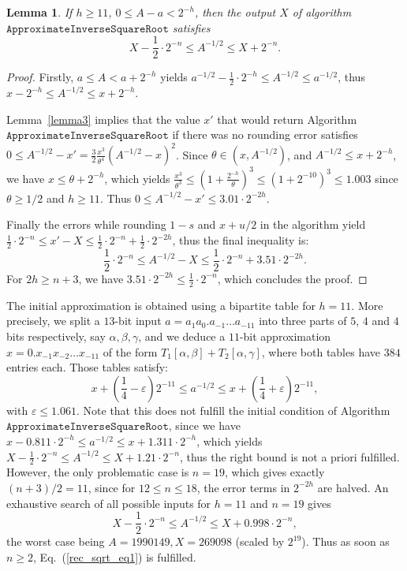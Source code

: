 \documentclass[12pt]{amsart}
\newtheorem{lemma}{Lemma}
\begin{document}
\begin{lemma} \label{lemma_recsqrt}
If $h \geq 11$, $0 \leq A - a < 2^{-h}$, then the output $X$ of algorithm
$\texttt{ApproximateInverseSquareRoot}$ satisfies
\begin{equation} \label{rec_sqrt_eq1}
X - \frac{1}{2} \cdot 2^{-n} \leq A^{-1/2} \leq X + 2^{-n}.
\end{equation}
\end{lemma}
\begin{proof}
Firstly, $a \leq A < a+2^{-h}$ yields
$a^{-1/2} - \frac{1}{2} \cdot 2^{-h} \leq A^{-1/2} \leq a^{-1/2}$,
thus $x - 2^{-h} \leq A^{-1/2} \leq x + 2^{-h}$.

Lemma~\ref{lemma3} implies that the value $x'$ that would return
Algorithm $\texttt{ApproximateInverseSquareRoot}$ if there was no rounding
error satisfies $0 \leq A^{-1/2} - x' = \frac{3}{2} \frac{x^3}{\theta^4} 
(A^{-1/2}-x)^2$. Since $\theta \in (x, A^{-1/2})$, and
$A^{-1/2} \leq x + 2^{-h}$, we have $x \leq \theta + 2^{-h}$,
which yields $\frac{x^3}{\theta^3} \leq (1 + \frac{2^{-h}}{\theta})^3
\leq (1 + 2^{-10})^3 \leq 1.003$ since $\theta \geq 1/2$ and $h \geq 11$.
Thus $0 \leq A^{-1/2} - x' \leq 3.01 \cdot 2^{-2h}$.

Finally the errors while rounding $1-s$ and $x+u/2$ in the algorithm 
yield $\frac{1}{2} \cdot 2^{-n} \leq x' - X \leq \frac{1}{2} \cdot 2^{-n}
+ \frac{1}{2} \cdot 2^{-2h}$, thus the final inequality is:
\[ \frac{1}{2} \cdot 2^{-n} \leq A^{-1/2} - X \leq 
\frac{1}{2} \cdot 2^{-n} + 3.51 \cdot 2^{-2h}. \]
For $2h \geq n+3$, we have $3.51 \cdot 2^{-2h} \leq \frac{1}{2} \cdot 2^{-n}$,
which concludes the proof.
\end{proof}

The initial approximation is obtained using a bipartite table for $h=11$.
More precisely, we split a $13$-bit input $a = a_1 a_0. a_{-1} \ldots a_{-11}$
into three parts of $5$, $4$ and $4$ bits respectively, say $\alpha,
\beta, \gamma$, and we deduce a $11$-bit approximation
$x = 0.x_{-1} x_{-2} \ldots x_{-11}$ of the form
$T_1[\alpha, \beta] + T_2[\alpha,\gamma]$, where both tables have $384$
entries each.
Those tables satisfy:
\[ x + (\frac{1}{4} - \varepsilon) 2^{-11} \leq a^{-1/2} \leq
   x + (\frac{1}{4} + \varepsilon) 2^{-11}, \]
with $\varepsilon \leq 1.061$.
Note that this does not fulfill the initial condition of
Algorithm $\texttt{ApproximateInverseSquareRoot}$, since
we have $x - 0.811 \cdot 2^{-h} \leq a^{-1/2} \leq x + 1.311 \cdot 2^{-h}$,
which yields $X - \frac{1}{2} \cdot 2^{-n} \leq A^{-1/2} \leq
              X + 1.21 \cdot 2^{-n}$,
thus the right bound is not a priori fulfilled.
However, the only problematic case is $n=19$, which gives exactly
$(n+3)/2 = 11$, since for $12 \leq n \leq 18$,
the error terms in $2^{-2h}$ are halved.
An exhaustive search of all possible inputs for $h=11$ and $n=19$ gives
\[ X - \frac{1}{2} \cdot 2^{-n} \leq A^{-1/2} \leq X + 0.998 \cdot 2^{-n},\]
the worst case being $A=1990149, X=269098$ (scaled by $2^{19}$).
Thus as soon as $n \geq 2$, Eq.~(\ref{rec_sqrt_eq1}) is fulfilled.
\end{document}
